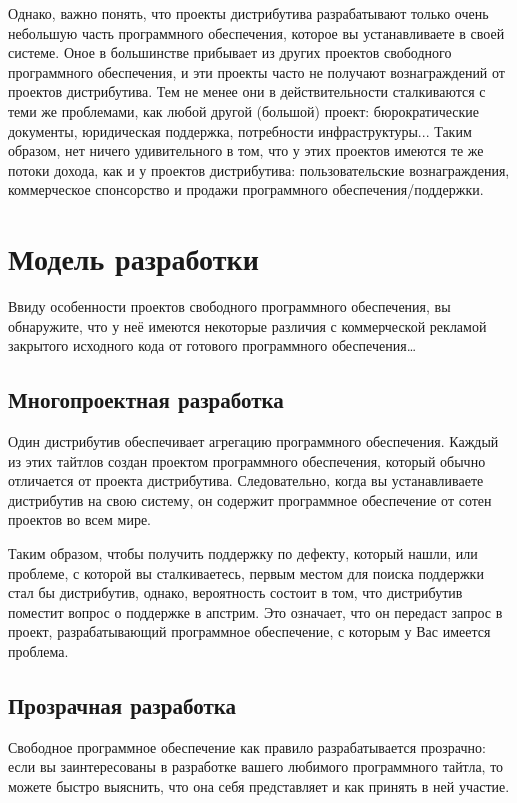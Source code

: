 \documentclass[10pt]{book}
\begin{document}
Однако, важно понять, что проекты дистрибутива  разрабатывают только очень небольшую часть программного обеспечения, которое вы устанавливаете в своей системе. Оное в большинстве прибывает из других проектов свободного программного обеспечения, и эти проекты часто не получают вознаграждений от проектов дистрибутива. Тем не менее они в действительности сталкиваются с теми же проблемами, как любой другой (большой) проект: бюрократические документы, юридическая поддержка, потребности инфраструктуры... Таким образом, нет ничего удивительного в том, что у этих проектов имеются те же потоки дохода, как и у проектов дистрибутива: пользовательские вознаграждения, коммерческое спонсорство и продажи программного обеспечения/поддержки.

\section{Модель разработки}

Ввиду особенности проектов свободного программного обеспечения, вы обнаружите, что у неё имеются некоторые различия с коммерческой рекламой закрытого исходного кода от готового программного обеспечения\ldots

\subsection{Многопроектная разработка}

Один дистрибутив обеспечивает агрегацию программного обеспечения. Каждый из этих тайтлов создан проектом программного обеспечения, который обычно отличается от проекта дистрибутива. Следовательно, когда вы устанавливаете дистрибутив на свою систему, он содержит программное обеспечение от сотен проектов во всем мире.

Таким образом, чтобы получить поддержку по дефекту, который нашли, или проблеме, с которой вы сталкиваетесь, первым местом для поиска поддержки стал бы дистрибутив, однако, вероятность состоит в том, что дистрибутив поместит вопрос о поддержке в апстрим. Это означает, что он передаст запрос в проект, разрабатывающий программное обеспечение, с которым у Вас имеется проблема.

\subsection{Прозрачная разработка}

Свободное программное обеспечение как правило разрабатывается прозрачно: если вы заинтересованы в разработке вашего любимого программного тайтла, то можете быстро выяснить, что она себя представляет и как принять в ней участие.
\end{document}
